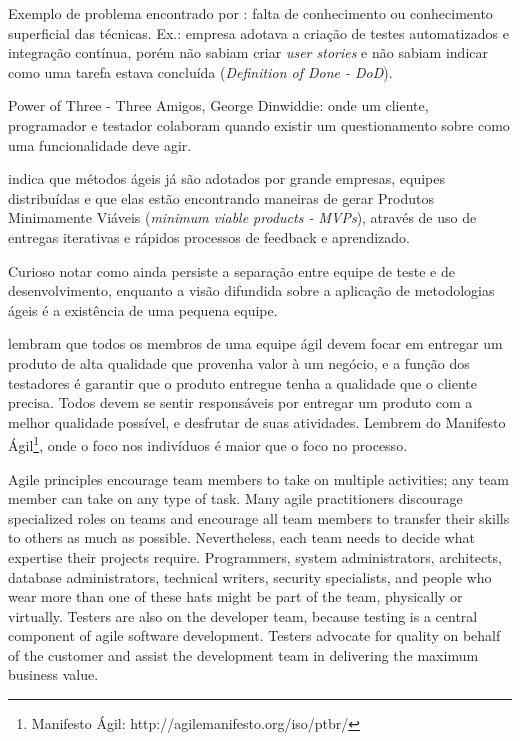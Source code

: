 \documentclass[
	12pt,				%
	openright,			%
	oneside,			%
	a4paper,			%
	english,			%
	brazil,				%
	]{abntex2}
\begin{document}
Exemplo de problema encontrado por : falta de conhecimento ou conhecimento superficial das técnicas. Ex.: empresa adotava a criação de testes automatizados e integração contínua, porém não sabiam criar \emph{user stories} e não sabiam indicar como uma tarefa estava concluída (\emph{Definition of Done - DoD}).

Power of Three - Three Amigos, George Dinwiddie: onde um cliente, programador e testador colaboram quando existir um questionamento sobre como uma funcionalidade deve agir.

 indica que métodos ágeis já são adotados por grande empresas, equipes distribuídas e que elas estão encontrando maneiras de gerar Produtos Minimamente Viáveis (\emph{minimum viable products - MVPs}), através de uso de entregas iterativas e rápidos processos de feedback e aprendizado.


Curioso notar como ainda persiste a separação entre equipe de teste e de desenvolvimento, enquanto a visão difundida sobre a aplicação de metodologias ágeis é a existência de uma pequena equipe.

 lembram que todos os membros de uma equipe ágil devem focar em entregar um produto de alta qualidade que provenha valor à um negócio, e a função dos testadores é garantir que o produto entregue tenha a qualidade que o cliente precisa. Todos devem se sentir responsáveis por entregar um produto com a melhor qualidade possível, e desfrutar de suas atividades. Lembrem do Manifesto Ágil\footnote{Manifesto Ágil: http://agilemanifesto.org/iso/ptbr/}, onde o foco nos indivíduos é maior que o foco no processo.%

Agile principles encourage team members to take on multiple activities; any team member can take on any type of task. Many agile practitioners discourage specialized roles on teams and encourage all team members to transfer their skills to others as much as possible. Nevertheless, each team needs to decide what expertise their projects require. Programmers, system administrators, architects, database administrators, technical writers, security specialists, and people who wear more than one of these hats might be part of the team, physically or virtually. Testers are also on the developer team, because testing is a central component of agile software development. Testers advocate for quality on behalf of the customer and assist the development team in delivering the maximum business value.
\end{document}
